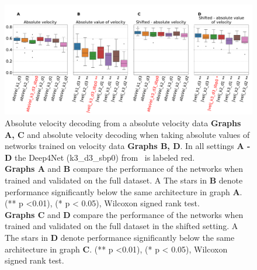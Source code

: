     
\begin{figure}[!htpb]
\centering
   \includegraphics[width=1\linewidth]{img/ch4/absVel_vs_abs_vel_performance_comparison}
   \caption[Absolute velocity vs. absolute value of velocity comparison]{Absolute velocity decoding from a absolute velocity data \textbf{Graphs A, C} and absolute velocity decoding when taking absolute values of networks trained on velocity data \textbf{Graphs B, D}. In all settings \textbf{
   A - D} the Deep4Net (k3\_d3\_sbp0) from~\cite{Hammer-2021} is labeled red.\\ \textbf{Graphs A} and \textbf{B} compare the performance of the networks when trained and validated on the full dataset. A The stars in \textbf{B} denote performance significantly below the same architecture in graph \textbf{A}. (** p <0.01), (* p < 0.05), Wilcoxon signed rank test.
   \\\textbf{Graphs C} and \textbf{D} compare the performance of the networks when trained and validated on the full dataset in the shifted setting. A The stars in \textbf{D} denote performance significantly below the same architecture in graph \textbf{C}. (** p <0.01), (* p < 0.05), Wilcoxon signed rank test.}
   \label{fig:absVel-vs-abs-vel-performance}
\end{figure}


